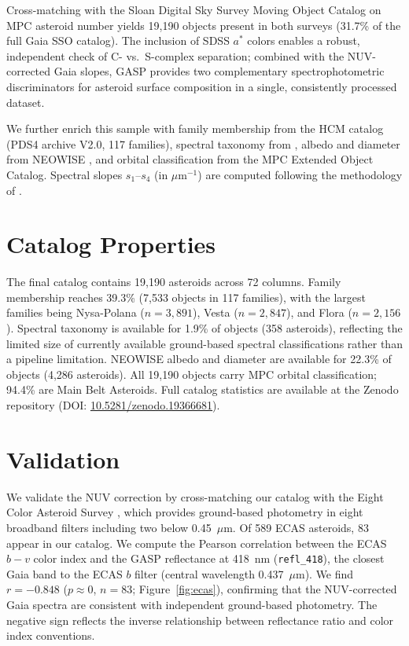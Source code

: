 \documentclass[modern]{aastex631}
\begin{document}
Cross-matching with the Sloan Digital Sky Survey Moving Object
Catalog \citep[SDSS MOC4;][]{Ivezic2001} on MPC asteroid number
yields 19,190 objects present in both surveys (31.7\% of the
full Gaia SSO catalog). The inclusion of SDSS $a^*$ colors
enables a robust, independent check of C- vs.\ S-complex
separation; combined with the NUV-corrected Gaia slopes, GASP
provides two complementary spectrophotometric discriminators for
asteroid surface composition in a single, consistently processed
dataset.

We further enrich this sample with family membership from the
\citet{Nesvorny2015} HCM catalog (PDS4 archive V2.0, 117
families), spectral taxonomy from \citet{Mahlke2022}, albedo and
diameter from NEOWISE \citep{Masiero2011}, and orbital
classification from the MPC Extended Object Catalog. Spectral
slopes $s_1$--$s_4$ (in $\mu$m$^{-1}$) are computed following
the methodology of \citet{TinautRuano2024}.

\section{Catalog Properties}

The final catalog contains 19,190 asteroids across 72 columns.
Family membership reaches 39.3\% (7,533 objects in 117 families),
with the largest families being Nysa-Polana ($n=3{,}891$),
Vesta ($n=2{,}847$), and Flora ($n=2{,}156$). Spectral taxonomy
is available for 1.9\% of objects (358 asteroids), reflecting
the limited size of currently available ground-based spectral
classifications rather than a pipeline limitation. NEOWISE
albedo and diameter are available for 22.3\% of objects
(4,286 asteroids). All 19,190 objects carry MPC orbital
classification; 94.4\% are Main Belt Asteroids. Full catalog
statistics are available at the Zenodo repository
(DOI: \href{https://doi.org/10.5281/zenodo.19366681}
{10.5281/zenodo.19366681}).

\section{Validation}

We validate the NUV correction by cross-matching our catalog
with the Eight Color Asteroid Survey
\citep[ECAS;][]{Zellner1985}, which provides ground-based
photometry in eight broadband filters including two below
0.45~$\mu$m. Of 589 ECAS asteroids, 83 appear in our catalog.
We compute the Pearson correlation between the ECAS $b-v$ color
index and the GASP reflectance at 418~nm (\texttt{refl\_418}),
the closest Gaia band to the ECAS $b$ filter (central wavelength
0.437~$\mu$m). We find $r = -0.848$ ($p \approx 0$, $n = 83$;
Figure~\ref{fig:ecas}), confirming that the NUV-corrected Gaia
spectra are consistent with independent ground-based photometry.
The negative sign reflects the inverse relationship between
reflectance ratio and color index conventions.
\end{document}
